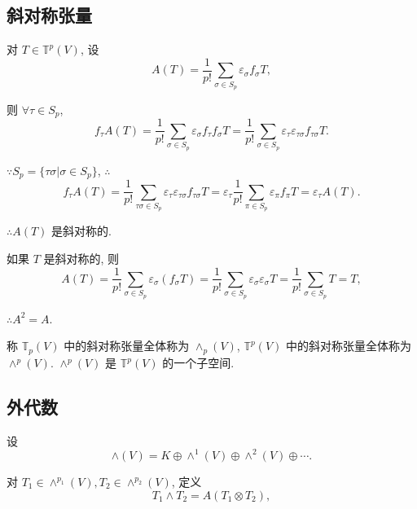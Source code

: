 \documentclass[color=black,device=normal,lang=cn,mode=geye]{elegantnote}
\begin{document}
\subsection{斜对称张量}
对 $T\in\mathbb{T}^p(V)$, 设
\[A(T)=\dfrac{1}{p!}\sum\limits_{\sigma\in S_p}\varepsilon_\sigma f_\sigma T,\]

则 $\forall\tau\in S_p$,
\[f_\tau A(T)=\dfrac{1}{p!}\sum\limits_{\sigma\in S_p}\varepsilon_\sigma f_\tau f_\sigma T=\dfrac{1}{p!}\sum\limits_{\sigma\in S_p}\varepsilon_\tau\varepsilon_{\tau\sigma}f_{\tau\sigma}T.\]

$\because S_p=\{\tau\sigma|\sigma\in S_p\}$, $\therefore$
\[f_\tau A(T)=\dfrac{1}{p!}\sum\limits_{\tau\sigma\in S_p}\varepsilon_\tau\varepsilon_{\tau\sigma}f_{\tau\sigma}T=\varepsilon_\tau\dfrac{1}{p!}\sum\limits_{\pi\in S_p}\varepsilon_\pi f_\pi T=\varepsilon_\tau A(T).\]

$\therefore A(T)$ 是斜对称的.

如果 $T$ 是斜对称的, 则
\[A(T)=\dfrac{1}{p!}\sum\limits_{\sigma\in S_p}\varepsilon_\sigma(f_\sigma T)=\dfrac{1}{p!}\sum\limits_{\sigma\in S_p}\varepsilon_\sigma\varepsilon_\sigma T=\dfrac{1}{p!}\sum\limits_{\sigma\in S_p}T=T,\]

$\therefore A^2=A$.

称 $\mathbb{T}_p(V)$ 中的斜对称张量全体称为 $\land_p(V)$, $\mathbb{T}^p(V)$ 中的斜对称张量全体称为 $\land^p(V)$. $\land^p(V)$ 是 $\mathbb{T}^p(V)$ 的一个子空间.
\subsection{外代数}
设
\[\land(V)=K\oplus\land^1(V)\oplus\land^2(V)\oplus\cdots.\]

对 $T_1\in\land^{p_1}(V),T_2\in\land^{p_2}(V)$, 定义
\[T_1\land T_2=A(T_1\otimes T_2),\]
\end{document}
